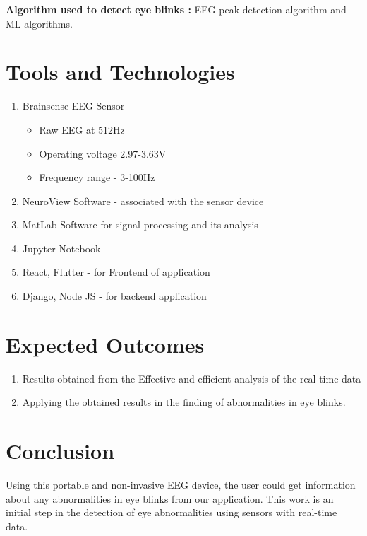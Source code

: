 \textbf{Algorithm used to detect eye blinks :} EEG peak detection algorithm and ML algorithms.
\section*{Tools and Technologies}
\begin{enumerate}
\item Brainsense EEG Sensor
\begin{itemize}
\item Raw EEG at 512Hz
\item Operating voltage 2.97-3.63V
\item Frequency range - 3-100Hz
\end{itemize}
\item NeuroView Software - associated with the sensor device
\item MatLab Software for signal processing and its analysis
\item Jupyter Notebook
\item React, Flutter - for Frontend of application 
\item Django, Node JS - for backend application

\end{enumerate}
\section*{Expected Outcomes}
\begin{enumerate}
\item Results obtained from the Effective and efficient analysis of the real-time data
\item Applying the obtained results in the finding of abnormalities in eye blinks.
\end{enumerate}
\section*{Conclusion}
Using this portable and non-invasive EEG device, the user could get information about any abnormalities in eye blinks from our application. This work is an initial step in the detection of eye abnormalities using sensors with real-time data.

